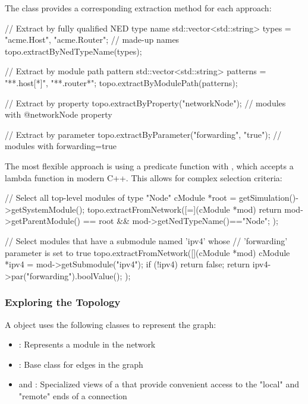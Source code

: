 The  class provides a corresponding extraction method for each
approach:

\begin{cpp}
// Extract by fully qualified NED type name
std::vector<std::string> types = {"acme.Host", "acme.Router"}; // made-up names
topo.extractByNedTypeName(types);

// Extract by module path pattern
std::vector<std::string> patterns = {"**.host[*]", "**.router*"};
topo.extractByModulePath(patterns);

// Extract by property
topo.extractByProperty("networkNode");  // modules with @networkNode property

// Extract by parameter
topo.extractByParameter("forwarding", "true");  // modules with forwarding=true
\end{cpp}

The most flexible approach is using a predicate function with
, which accepts a lambda function in modern C++.
This allows for complex selection criteria:

\begin{cpp}
// Select all top-level modules of type "Node"
cModule *root = getSimulation()->getSystemModule();
topo.extractFromNetwork([=](cModule *mod) {
    return mod->getParentModule() == root && mod->getNedTypeName()=="Node";
});

// Select modules that have a submodule named 'ipv4' whose
// 'forwarding' parameter is set to true
topo.extractFromNetwork([](cModule *mod) {
    cModule *ipv4 = mod->getSubmodule("ipv4");
    if (!ipv4)
        return false;
    return ipv4->par("forwarding").boolValue();
});
\end{cpp}

\subsubsection{Exploring the Topology}
\label{sec:sim-lib:ctopology-exploring}

A  object uses the following classes to represent the graph:
\begin{itemize}
  \item {}: Represents a module in the network
  \item {}: Base class for edges in the graph
  \item {} and : Specialized
        views of a  that provide convenient access to the "local" and
        "remote" ends of a connection
\end{itemize}

